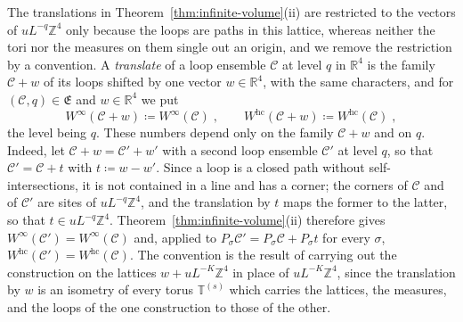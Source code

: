 \documentclass[11pt]{preprint}
\numberwithin{equation}{section}
\theoremstyle{definition}
\theoremstyle{remark}
\theoremstyle{plain}
\begin{document}
The translations in Theorem~\ref{thm:infinite-volume}(ii) are restricted to the vectors of $uL^{-q}\mathbb Z^4$ only because the loops are paths in this lattice, whereas neither the tori nor the measures on them single out an origin, and we remove the restriction by a convention. A \emph{translate} of a loop ensemble $\mathcal C$ at level $q$ in $\mathbb R^4$ is the family $\mathcal C + w$ of its loops shifted by one vector $w \in \mathbb R^4$, with the same characters, and for $(\mathcal C, q) \in \mathfrak E$ and $w \in \mathbb R^4$ we put
\begin{equation}\label{eq:translate-convention}
    W^\infty(\mathcal C + w) \coloneqq W^\infty(\mathcal C)\;,
    \qquad
    W^{\mathrm{hc}}(\mathcal C + w) \coloneqq W^{\mathrm{hc}}(\mathcal C)\;,
\end{equation}
the level being $q$. These numbers depend only on the family $\mathcal C + w$ and on $q$. Indeed, let $\mathcal C + w = \mathcal C' + w'$ with a second loop ensemble $\mathcal C'$ at level $q$, so that $\mathcal C' = \mathcal C + t$ with $t \coloneqq w - w'$. Since a loop is a closed path without self-intersections, it is not contained in a line and has a corner; the corners of $\mathcal C$ and of $\mathcal C'$ are sites of $uL^{-q}\mathbb Z^4$, and the translation by $t$ maps the former to the latter, so that $t \in uL^{-q}\mathbb Z^4$. Theorem~\ref{thm:infinite-volume}(ii) therefore gives $W^\infty(\mathcal C') = W^\infty(\mathcal C)$ and, applied to $P_\sigma\mathcal C' = P_\sigma\mathcal C + P_\sigma t$ for every $\sigma$, $W^{\mathrm{hc}}(\mathcal C') = W^{\mathrm{hc}}(\mathcal C)$. The convention is the result of carrying out the construction on the lattices $w + uL^{-K}\mathbb Z^4$ in place of $uL^{-K}\mathbb Z^4$, since the translation by $w$ is an isometry of every torus $\mathbb T^{(s)}$ which carries the lattices, the measures, and the loops of the one construction to those of the other.
\end{document}
